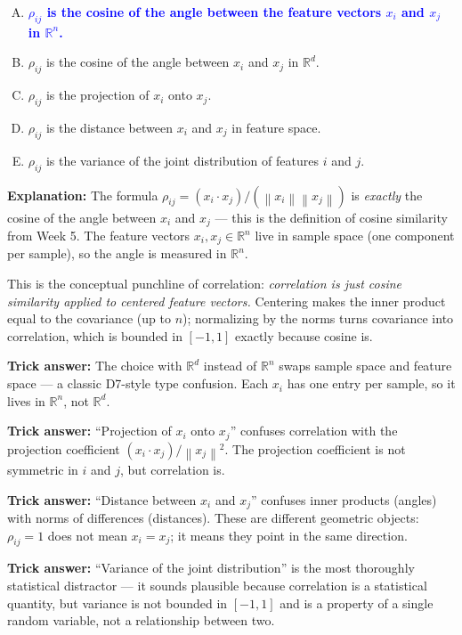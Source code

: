 \documentclass[12pt]{amsart}
\newcommand{\norm}[1]{\left\|#1\right\|}
\begin{document}
\begin{enumerate}[(A)]
    \item \textcolor{blue}{\textbf{$\rho_{ij}$ is the cosine of the angle between the feature vectors $x_i$ and $x_j$ in $\mathbb{R}^n$.}}
    \item $\rho_{ij}$ is the cosine of the angle between $x_i$ and $x_j$ in $\mathbb{R}^d$.
    \item $\rho_{ij}$ is the projection of $x_i$ onto $x_j$.
    \item $\rho_{ij}$ is the distance between $x_i$ and $x_j$ in feature space.
    \item $\rho_{ij}$ is the variance of the joint distribution of features $i$ and $j$.
\end{enumerate}

\textbf{Explanation:}
The formula $\rho_{ij} = (x_i \cdot x_j) / (\norm{x_i} \norm{x_j})$ is
\emph{exactly} the cosine of the angle between $x_i$ and $x_j$ --- this is
the definition of cosine similarity from Week 5. The feature vectors
$x_i, x_j \in \mathbb{R}^n$ live in sample space (one component per sample),
so the angle is measured in $\mathbb{R}^n$.

This is the conceptual punchline of correlation: \emph{correlation is just
cosine similarity applied to centered feature vectors.} Centering makes
the inner product equal to the covariance (up to $n$); normalizing by the
norms turns covariance into correlation, which is bounded in $[-1, 1]$
exactly because cosine is.

\textbf{Trick answer:}
The choice with $\mathbb{R}^d$ instead of $\mathbb{R}^n$ swaps sample
space and feature space --- a classic D7-style type confusion. Each $x_i$
has one entry per sample, so it lives in $\mathbb{R}^n$, not $\mathbb{R}^d$.

\textbf{Trick answer:}
``Projection of $x_i$ onto $x_j$'' confuses correlation with the projection
coefficient $(x_i \cdot x_j)/\norm{x_j}^2$. The projection coefficient is
not symmetric in $i$ and $j$, but correlation is.

\textbf{Trick answer:}
``Distance between $x_i$ and $x_j$'' confuses inner products (angles) with
norms of differences (distances). These are different geometric objects:
$\rho_{ij} = 1$ does not mean $x_i = x_j$; it means they point in the
same direction.

\textbf{Trick answer:}
``Variance of the joint distribution'' is the most thoroughly statistical
distractor --- it sounds plausible because correlation is a statistical
quantity, but variance is not bounded in $[-1, 1]$ and is a property of a
single random variable, not a relationship between two.
\end{document}
